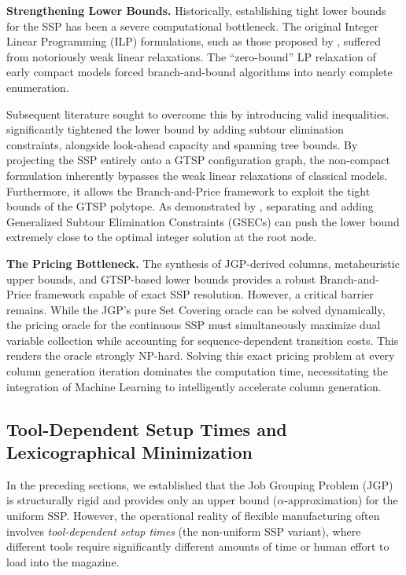 \documentclass[12pt]{article}
\begin{document}
\textbf{Strengthening Lower Bounds.} Historically, establishing tight lower bounds for the SSP has been a severe computational bottleneck. The original Integer Linear Programming (ILP) formulations, such as those proposed by \citet{Tang1988}, suffered from notoriously weak linear relaxations. The ``zero-bound'' LP relaxation of early compact models forced branch-and-bound algorithms into nearly complete enumeration. 

Subsequent literature sought to overcome this by introducing valid inequalities. \citet{Laporte2004} significantly tightened the lower bound by adding subtour elimination constraints, alongside look-ahead capacity and spanning tree bounds. By projecting the SSP entirely onto a GTSP configuration graph, the non-compact formulation inherently bypasses the weak linear relaxations of classical models. Furthermore, it allows the Branch-and-Price framework to exploit the tight bounds of the GTSP polytope. As demonstrated by \citet{Fischetti1997}, separating and adding Generalized Subtour Elimination Constraints (GSECs) can push the lower bound extremely close to the optimal integer solution at the root node.

\textbf{The Pricing Bottleneck.} The synthesis of JGP-derived columns, metaheuristic upper bounds, and GTSP-based lower bounds provides a robust Branch-and-Price framework capable of exact SSP resolution. However, a critical barrier remains. While the JGP's pure Set Covering oracle can be solved dynamically, the pricing oracle for the continuous SSP must simultaneously maximize dual variable collection while accounting for sequence-dependent transition costs. This renders the oracle strongly NP-hard. Solving this exact pricing problem at every column generation iteration dominates the computation time, necessitating the integration of Machine Learning to intelligently accelerate column generation.


\subsection{Tool-Dependent Setup Times and Lexicographical Minimization}

In the preceding sections, we established that the Job Grouping Problem (JGP) is structurally rigid and provides only an upper bound ($\alpha$-approximation) for the uniform SSP. However, the operational reality of flexible manufacturing often involves \textit{tool-dependent setup times} (the non-uniform SSP variant), where different tools require significantly different amounts of time or human effort to load into the magazine. 
\end{document}
